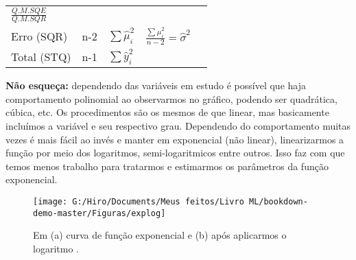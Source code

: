 \documentclass[
]{book}
\begin{document}
\begin{longtable}[]{@{}lllll@{}}
\begin{minipage}[t]{0.17\columnwidth}
\(\frac{Q.M.SQE}{Q.M.SQR}\)\strut
\end{minipage}\tabularnewline
\begin{minipage}[t]{0.17\columnwidth}\raggedright
Erro (SQR)\strut
\end{minipage} & \begin{minipage}[t]{0.17\columnwidth}\raggedright
n-2\strut
\end{minipage} & \begin{minipage}[t]{0.17\columnwidth}\raggedright
\(\sum \hat{\mu}_i^2\)\strut
\end{minipage} & \begin{minipage}[t]{0.17\columnwidth}\raggedright
\(\frac{\sum \mu_i^2}{n-2}=\hat{\sigma}^2\)\strut
\end{minipage} & \begin{minipage}[t]{0.17\columnwidth}\raggedright
\strut
\end{minipage}\tabularnewline
\begin{minipage}[t]{0.17\columnwidth}\raggedright
Total (STQ)\strut
\end{minipage} & \begin{minipage}[t]{0.17\columnwidth}\raggedright
n-1\strut
\end{minipage} & \begin{minipage}[t]{0.17\columnwidth}\raggedright
\(\sum \hat{y}_i^2\)\strut
\end{minipage} & \begin{minipage}[t]{0.17\columnwidth}\raggedright
\strut
\end{minipage} & \begin{minipage}[t]{0.17\columnwidth}\raggedright
\strut
\end{minipage}\tabularnewline
\bottomrule
\end{longtable}

\textbf{Não esqueça:} dependendo das variáveis em estudo é possível que haja comportamento polinomial ao observarmos no gráfico, podendo ser quadrática, cúbica, etc. Os procedimentos são os mesmos de que linear, mas basicamente incluímos a variável e seu respectivo grau. Dependendo do comportamento muitas vezes é mais fácil ao invés e manter em exponencial (não linear), linearizarmos a função por meio dos logaritmos, semi-logaritmicos entre outros. Isso faz com que temos menos trabalho para tratarmos e estimarmos os parâmetros da função exponencial.

\begin{figure}

{\centering \texttt{[image: G:/Hiro/Documents/Meus feitos/Livro ML/bookdown-demo-master/Figuras/explog]} 

}

\caption{Em (a) curva de função exponencial e (b) após aplicarmos o logaritmo \citep{gujarati2011econometria}.}\label{fig:explog}
\end{figure}
\end{document}
